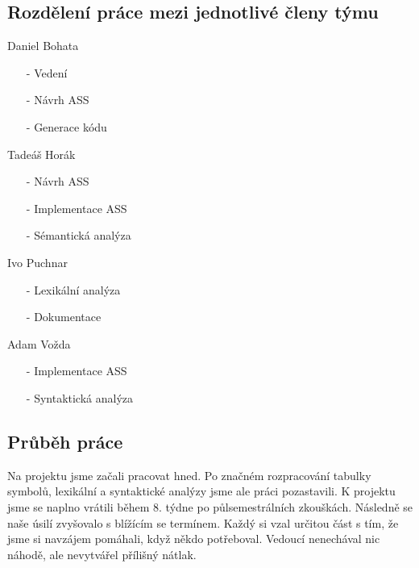 \documentclass[a4paper, 12pt]{article}
\begin{document}
\subsection{Rozdělení práce mezi jednotlivé členy týmu}
\begin{itemize}
    \begin{minipage}{0.5\linewidth}   
        \item Daniel Bohata
        \begin{itemize}
        \item[-] Vedení
        \item[-] Návrh ASS
        \item[-] Generace kódu 
        \end{itemize}
        \item Tadeáš Horák
        \begin{itemize}
        \item[-] Návrh ASS
        \item[-] Implementace ASS
        \item[-] Sémantická analýza
        \end{itemize}
        \item Ivo Puchnar
        \begin{itemize}
        \item[-] Lexikální analýza
        \item[-] Dokumentace
        \end{itemize}
        \item Adam Vožda
        \begin{itemize}
        \item[-] Implementace ASS
        \item[-] Syntaktická analýza
        \end{itemize}
    \end{minipage}
\end{itemize}

\newpage
\subsection{Průběh práce}
Na projektu jsme začali pracovat hned. Po značném rozpracování tabulky symbolů, lexikální a syntaktické analýzy jsme ale práci pozastavili. K projektu jsme se naplno vrátili během 8. týdne po půlsemestrálních zkouškách. Následně se naše úsilí zvyšovalo s blížícím se termínem. Každý si vzal určitou část s tím, že jsme si navzájem pomáhali, když někdo potřeboval. Vedoucí nenechával nic náhodě, ale nevytvářel přílišný nátlak.
\end{document}
